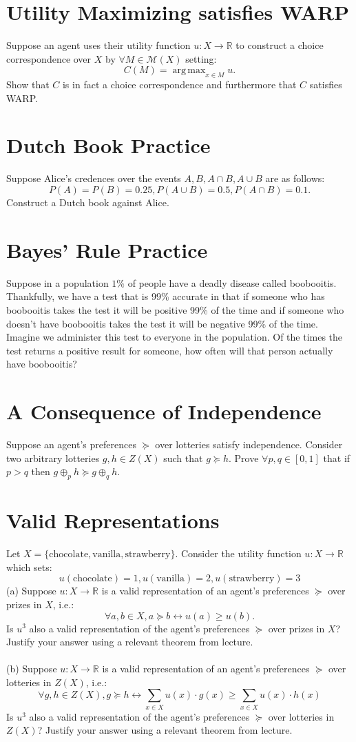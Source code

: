 \documentclass[11pt]{article}
\title{}
\date{}
\DeclareMathOperator*{\argmax}{arg\,max}
\theoremstyle{definition}
\theoremstyle{plain}
\begin{document}
\section{Utility Maximizing satisfies WARP}
Suppose an agent uses their utility function $u:X \to \mathbb{R}$ to construct a choice correspondence over $X$ by $\forall M \in \mathcal{M}(X)$ setting:
$$C(M)=\argmax_{x \in M} u.$$
Show that $C$ is in fact a choice correspondence and furthermore that $C$ satisfies WARP.

\section{Dutch Book Practice}
Suppose Alice's credences over the events $A, B, A\cap B, A \cup B$ are as follows:
$$P(A)=P(B)=0.25,P(A\cup B)=0.5,P(A\cap B)=0.1.$$
Construct a Dutch book against Alice.

\section{Bayes' Rule Practice} 
Suppose in a population $1\%$ of people have a deadly disease called boobooitis. Thankfully, we have a test that is 99\% accurate in that if someone who has boobooitis takes the test it will be positive 99\% of the time and if someone who doesn't have boobooitis takes the test it will be negative 99\% of the time. Imagine we administer this test to everyone in the population. Of the times the test returns a positive result for someone, how often will that person actually have boobooitis? 

\section{A Consequence of Independence}
Suppose an agent's preferences $\succeq$ over lotteries satisfy independence. Consider two arbitrary lotteries $g, h \in Z(X)$ such that $g \succeq h$. Prove $\forall p,q \in [0,1]$ that if $p>q$ then $g \oplus_p h \succeq g \oplus_q h$.



\section{Valid Representations}
Let $X=\{\text{chocolate}, \text{vanilla}, \text{strawberry}\}$. Consider the utility function $u:X \to \mathbb{R}$ which sets:
$$u(\text{chocolate})=1,u(\text{vanilla})=2,u(\text{strawberry})=3$$
(a) Suppose $u: X \to \mathbb{R}$ is a valid representation of an agent's preferences $\succeq$ over prizes in $X$, i.e.:
$$\forall a, b \in X, a \succeq b \leftrightarrow u(a) \geq u(b).$$
Is $u^3$ also a valid representation of the agent's preferences $\succeq$ over prizes in $X$? Justify your answer using a relevant theorem from lecture. 
\\
\\
(b) Suppose $u: X \to \mathbb{R}$ is a valid representation of an agent's preferences $\succeq$ over lotteries in $Z(X)$, i.e.:
$$\forall g,h \in Z(X), g \succeq h \leftrightarrow \sum_{x \in X}u(x) \cdot g(x) \geq \sum_{x \in X}u(x) \cdot h(x)$$
Is $u^3$ also a valid representation of the agent's preferences $\succeq$ over lotteries in $Z(X)$? Justify your answer using a relevant theorem from lecture. 
\end{document}
